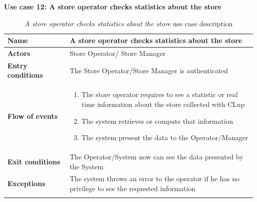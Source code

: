\clearpage
\textbf{Use case 12: A store operator checks statistics about the store}
\smallskip
{}
\begin{longtable}{p{0.25\linewidth}p{0.75\linewidth}}
    \toprule
    \textbf{Name}             & \textbf{A store operator checks statistics about the store}                                        \\
    \midrule
    \textbf{Actors}           & Store Operator/ Store Manager                                                                      \\
    \midrule
    \textbf{Entry conditions} & The Store Operator/Store Manager is authenticated                                                  \\
    \midrule
    \textbf{Flow of events}   &
    \begin{enumerate}
        \item The store operator requires to see a statistic or real time information about the store collected with CLup
        \item The system retrieves or compute that information
        \item The system present the data to the Operator/Manager
    \end{enumerate}                                                                                                     \\
    \midrule
    \textbf{Exit conditions}  & The Operator/System now can see the data presented by the System                                   \\
    \midrule
    \textbf{Exceptions}       & The system throws an error to the operator if he has no privilege to see the requested information \\
    \bottomrule
    \caption{\emph{A store operator checks statistics about the store} use case description}
\end{longtable}


